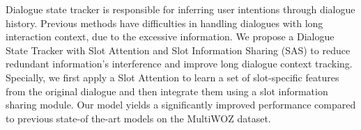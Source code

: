 Dialogue state tracker is responsible for inferring user intentions through dialogue history. Previous methods have difficulties in handling dialogues with long interaction context, due to the excessive information. We propose a Dialogue State Tracker with Slot Attention and Slot Information Sharing (SAS) to reduce redundant information's interference and improve long dialogue context tracking. Specially, we first apply a Slot Attention to learn a set of slot-specific features from the original dialogue and then integrate them using a slot information sharing module. Our model yields a significantly improved performance compared to previous state-of the-art models on the MultiWOZ dataset.
